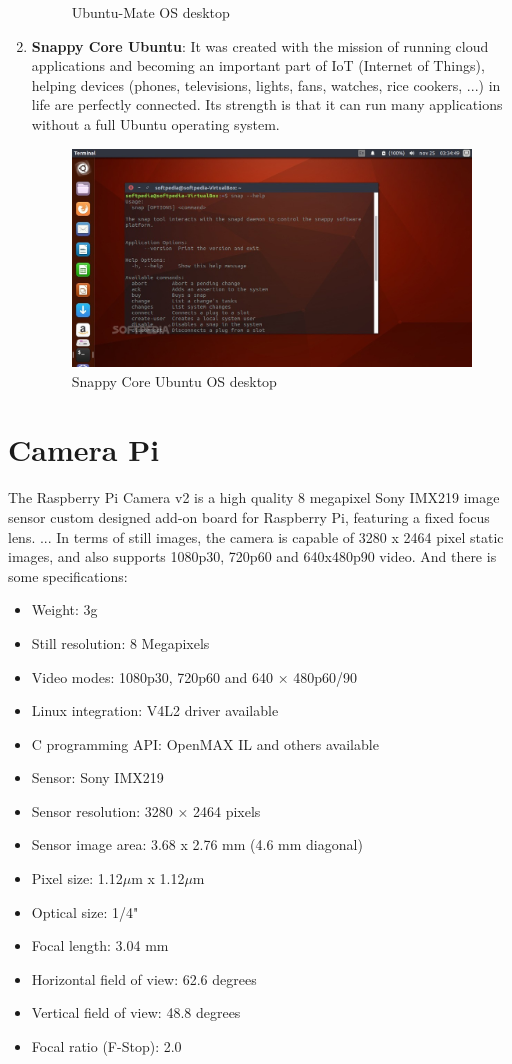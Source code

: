 \begin{enumerate}
\begin{figure}[H]
                \caption{Ubuntu-Mate OS desktop}
            \end{figure}
            \item \textbf{Snappy Core Ubuntu}: It was created with the mission of running cloud applications and becoming an important part of IoT (Internet of Things), helping devices (phones, televisions, lights, fans, watches, rice cookers, ...) in life are perfectly connected. 
            Its strength is that it can run many applications without a full Ubuntu operating system.
            \begin{figure}[H]
                \centering
                \includegraphics[width=0.6\linewidth]{img/snappy.jpg}
                \caption{Snappy Core Ubuntu OS desktop}
            \end{figure}
        \end{enumerate}

\section{Camera Pi}
    The Raspberry Pi Camera v2 is a high quality 8 megapixel Sony IMX219 image sensor custom designed add-on board for Raspberry Pi, featuring a fixed focus lens. ... In terms of still images, the camera is capable of 3280 x 2464 pixel static images, and also supports 1080p30, 720p60 and 640x480p90 video.
    And there is some specifications:
    \begin{itemize}
        \item Weight: 3g
        \item Still resolution: 8 Megapixels
        \item Video modes: 1080p30, 720p60 and 640 × 480p60/90
        \item Linux integration: V4L2 driver available
        \item C programming API: OpenMAX IL and others available
        \item Sensor: Sony IMX219
        \item Sensor resolution: 3280 × 2464 pixels
        \item Sensor image area: 3.68 x 2.76 mm (4.6 mm diagonal) 
        \item Pixel size: 1.12$\mu$m x 1.12$\mu$m
        \item Optical size: 1/4"
        \item Focal length: 3.04 mm
        \item Horizontal field of view: 62.6 degrees 
        \item Vertical field of view: 48.8 degrees 
        \item Focal ratio (F-Stop): 2.0
    \end{itemize}